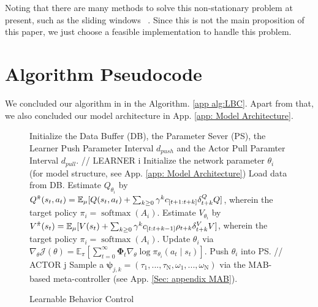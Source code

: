 Noting that there are many methods to solve this non-stationary problem at present, such as the sliding windows ~\citep{agent57}. Since this is not the main proposition of this paper, we just choose a feasible implementation to handle this problem.

\clearpage

\section{Algorithm Pseudocode}
\label{app: Algorithm Pseudocode}
We concluded our algorithm in in the Algorithm. \ref{app alg:LBC}. Apart from that, we also concluded our model architecture in App. \ref{app: Model Architecture}.

\begin{figure}[ht]
  \centering
  \vspace{-0.1in}
  \begin{minipage}{\linewidth}
    \begin{algorithm}[H]
      \caption{Learnable Behavior Control}
          \begin{algorithmic}
          \STATE Initialize the Data Buffer (DB), the Parameter Sever (PS), the Learner Push Parameter Interval $d_{push}$ and the Actor Pull Paramter Interval  $d_{pull}$.
          \STATE // LEARNER i
          \STATE Initialize the network parameter $\theta_i$ (for model structure, see App. \ref{app: Model Architecture})
          \STATE Load data from DB.
          \STATE Estimate $Q_{\theta_i}$ by $Q^{\Tilde{\pi}} (s_t, a_t) = \mathbb{E}_{\mu} [ Q(s_t, a_t) + \sum_{k \geq 0} \gamma^k 
c_{[t+1:t+k]} \delta^{Q}_{t+k} Q ]$, wherein the target policy $\pi_i=\operatorname{softmax}(A_i)$.
          \STATE Estimate $V_{\theta_i}$ by $V^{\Tilde{\pi}} (s_t) 
        = \mathbb{E}_{\mu} [ 
        V(s_t) + \sum_{k \geq 0} \gamma^k 
     c_{[t:t+k-1]} \rho_{t+k}  \delta^{V}_{t+k} V ]$, wherein the target policy $\pi_i=\operatorname{softmax}(A_i)$.
          \STATE Update $\theta_i$ via $\nabla_{\theta} \mathcal{J}(\theta)=\mathbb{E}_{\pi}\left[\sum_{t=0}^{\infty} \bm{\Phi}_{t} \nabla_{\theta} \log \pi_{\theta_i}\left(a_{t} \mid s_{t}\right)\right].$
          \STATE Push $\theta_i$ into PS.
          \ENDIF
          \ENDFOR
          \STATE // ACTOR j
            \STATE   Sample a $\bm{\psi}_{j,k}=(\tau_1,...,\tau_{\mathrm{N}},\omega_1,...,\omega_{\mathrm{N}})$ via the MAB-based meta-controller (see App. \ref{Sec: appendix MAB}).
            

\end{algorithmic}
\end{algorithm}
\end{minipage}
\end{figure}
